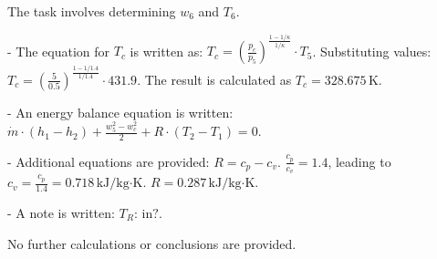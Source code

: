 The task involves determining \( w_6 \) and \( T_6 \).  

- The equation for \( T_c \) is written as:  
  \( T_c = \left( \frac{p_c}{p_5} \right)^{\frac{1 - 1/\kappa}{1/\kappa}} \cdot T_5 \).  
  Substituting values:  
  \( T_c = \left( \frac{5}{0.5} \right)^{\frac{1 - 1/1.4}{1/1.4}} \cdot 431.9 \).  
  The result is calculated as \( T_c = 328.675 \, \text{K} \).  

- An energy balance equation is written:  
  \( \dot{m} \cdot (h_1 - h_2) + \frac{w_5^2 - w_c^2}{2} + R \cdot (T_2 - T_1) = 0 \).  

- Additional equations are provided:  
  \( R = c_p - c_v \).  
  \( \frac{c_p}{c_v} = 1.4 \), leading to \( c_v = \frac{c_p}{1.4} = 0.718 \, \text{kJ/kg·K} \).  
  \( R = 0.287 \, \text{kJ/kg·K} \).  

- A note is written:  
  \( T_R: \, \text{in?} \).  

No further calculations or conclusions are provided.